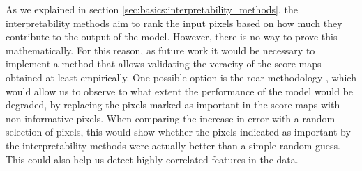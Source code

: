 As we explained in section \ref{sec:basics:interpretability_methods}, the interpretability methods aim to rank the input pixels based on how much they contribute to the output of the model.
However, there is no way to prove this mathematically. For this reason, as future work it would be necessary to implement a method that allows validating the veracity of the score maps obtained at least empirically.
One possible option is the \gls{roar} methodology \cite{hooker2018benchmark}, which would allow us to observe to what extent the performance of the model would be degraded, by replacing the pixels marked as important in the score maps with non-informative pixels. When comparing the increase in error with a random selection of pixels, this would show whether the pixels indicated as important by the interpretability methods were actually better than a simple random guess. This could also help us detect highly correlated features in the data.
